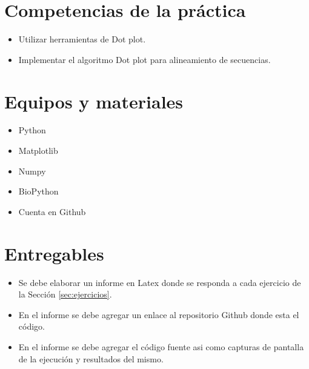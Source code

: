\documentclass{article}
\begin{document}
	
	\section{Competencias de la práctica}
	\begin{itemize}
		\item Utilizar herramientas de Dot plot.
		\item Implementar el algoritmo Dot plot para alineamiento de secuencias.
	\end{itemize}
	
	\section{Equipos y materiales}
	\begin{itemize}
		\item Python
		\item Matplotlib 
		\item Numpy 
		\item BioPython
		\item Cuenta en Github
	\end{itemize}
	
	\section{Entregables}
	\begin{itemize}
		\item Se debe elaborar un informe en Latex donde se responda a cada ejercicio de la Sección \ref{sec:ejercicios}.
		\item En el informe se debe agregar un enlace al repositorio Github donde esta el código.
		\item En el informe se debe agregar el código fuente asi como capturas de pantalla de la ejecución y resultados del mismo.
	\end{itemize}
	
	
	
	
	\clearpage
	
	
\end{document}
